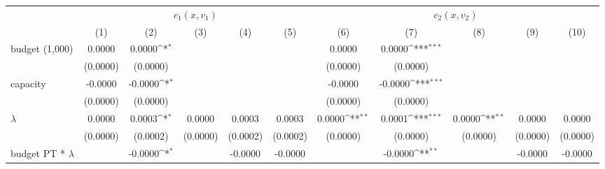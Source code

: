 {
\def\sym#1{\ifmmode^{#1}\else\(^{#1}\)\fi}
\begin{tabular}{l*{10}{c}}
\hline\hline
                    &\multicolumn{5}{c}{$ c_{1}(x,v_{1})$}                                                                        &\multicolumn{5}{c}{$ c_{2}(x,v_{2})$}                                                                        \\\cmidrule(lr){2-6}\cmidrule(lr){7-11}
                    &\multicolumn{1}{c}{(1)}         &\multicolumn{1}{c}{(2)}         &\multicolumn{1}{c}{(3)}         &\multicolumn{1}{c}{(4)}         &\multicolumn{1}{c}{(5)}         &\multicolumn{1}{c}{(6)}         &\multicolumn{1}{c}{(7)}         &\multicolumn{1}{c}{(8)}         &\multicolumn{1}{c}{(9)}         &\multicolumn{1}{c}{(10)}         \\
\hline
budget (1,000)      &      0.0000         &      0.0000\sym{*}  &                     &                     &                     &      0.0000         &      0.0000\sym{***}&                     &                     &                     \\
                    &    (0.0000)         &    (0.0000)         &                     &                     &                     &    (0.0000)         &    (0.0000)         &                     &                     &                     \\
[1em]
capacity            &     -0.0000         &     -0.0000\sym{*}  &                     &                     &                     &     -0.0000         &     -0.0000\sym{***}&                     &                     &                     \\
                    &    (0.0000)         &    (0.0000)         &                     &                     &                     &    (0.0000)         &    (0.0000)         &                     &                     &                     \\
[1em]
$\lambda$           &      0.0000         &      0.0003\sym{*}  &      0.0000         &      0.0003         &      0.0003         &      0.0000\sym{**} &      0.0001\sym{***}&      0.0000\sym{**} &      0.0000         &      0.0000         \\
                    &    (0.0000)         &    (0.0002)         &    (0.0000)         &    (0.0002)         &    (0.0002)         &    (0.0000)         &    (0.0000)         &    (0.0000)         &    (0.0000)         &    (0.0000)         \\
[1em]
budget PT * $\lambda$&                     &     -0.0000\sym{*}  &                     &     -0.0000         &     -0.0000         &                     &     -0.0000\sym{**} &                     &     -0.0000         &     -0.0000         \\

\end{tabular}}
